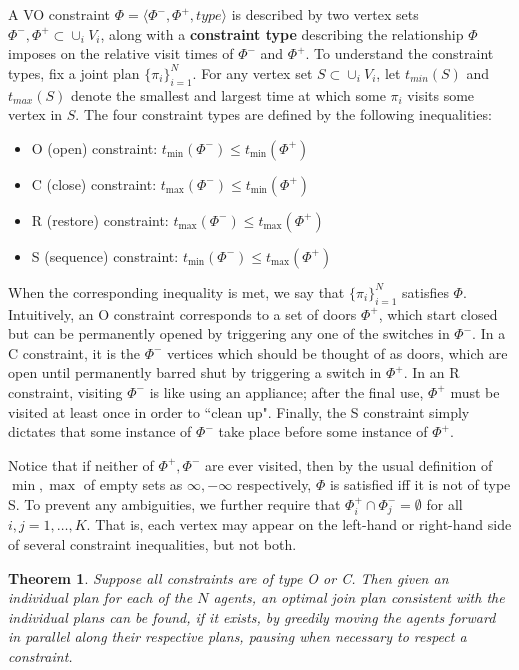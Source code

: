 \documentclass[letterpaper]{article}
\newtheorem{thm}{Theorem}
\begin{document}
A VO constraint $\Phi = \langle\Phi^-,\Phi^+,type\rangle$ is described by two vertex sets $\Phi^-,\Phi^+\subset \cup_i V_i$, along with a \textbf{constraint type} describing the relationship $\Phi$ imposes on the relative visit times of $\Phi^-$ and $\Phi^+$. To understand the constraint types, fix a joint plan $\{\pi_i\}_{i=1}^N$. For any vertex set $S \subset \cup_i V_i$, let $t_{min}(S)$ and $t_{max}(S)$ denote the smallest and largest time at which some $\pi_i$ visits some vertex in $S$. The four constraint types are defined by the following inequalities:

\begin{itemize}
\item O (open) constraint: $t_{\min}(\Phi^-) \le t_{\min}(\Phi^+)$
\item C (close) constraint: $t_{\max}(\Phi^-) \le t_{\min}(\Phi^+)$
\item R (restore) constraint: $t_{\max}(\Phi^-) \le t_{\max}(\Phi^+)$
\item S (sequence) constraint: $t_{\min}(\Phi^-) \le t_{\max}(\Phi^+)$
\end{itemize}

When the corresponding inequality is met, we say that $\{\pi_i\}_{i=1}^N$ satisfies $\Phi$. Intuitively, an O constraint corresponds to a set of doors $\Phi^+$, which start closed but can be permanently opened by triggering any one of the switches in $\Phi^-$. In a C constraint, it is the $\Phi^-$ vertices which should be thought of as doors, which are open until permanently barred shut by triggering a switch in $\Phi^+$. In an R constraint, visiting $\Phi^-$ is like using an appliance; after the final use, $\Phi^+$ must be visited at least once in order to ``clean up". Finally, the S constraint simply dictates that some instance of $\Phi^-$ take place before some instance of $\Phi^+$.

Notice that if neither of $\Phi^+,\Phi^-$ are ever visited, then by the usual definition of $\min,\max$ of empty sets as $\infty, -\infty$ respectively, $\Phi$ is satisfied iff it is not of type S. To prevent any ambiguities, we further require that $\Phi_i^+ \cap \Phi_j^- = \emptyset$ for all $i,j = 1,\ldots,K$. That is, each vertex may appear on the left-hand or right-hand side of several constraint inequalities, but not both.


\begin{thm} Suppose all constraints are of type O or C. Then given an individual plan for each of the $N$ agents, an optimal join plan consistent with the individual plans can be found, if it exists, by greedily moving the agents forward in parallel along their respective plans, pausing when necessary to respect a constraint.
\end{thm}
\end{document}
